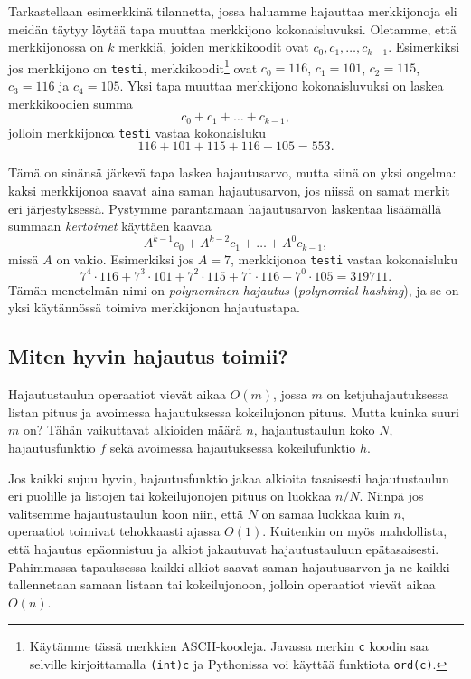 Tarkastellaan esimerkkinä tilannetta, jossa haluamme hajauttaa merkkijonoja
eli mei\-dän täytyy löytää tapa muuttaa merkkijono kokonaisluvuksi.
Oletamme, että merkkijonossa on $k$ merkkiä,
joiden merkkikoodit ovat $c_0,c_1,\dots,c_{k-1}$.
Esimerkiksi jos merkkijono on \texttt{testi},
merkkikoodit\footnote{Käytämme tässä merkkien ASCII-koodeja.
Javassa merkin \texttt{c} koodin saa
selville kirjoittamalla \texttt{(int)c}
ja Pythonissa voi käyttää funktiota \texttt{ord(c)}.} ovat $c_0=116$, $c_1=101$, $c_2=115$,
$c_3=116$ ja $c_4=105$.
Yksi tapa muuttaa merkkijono kokonaisluvuksi
on laskea merkkikoodien summa
\[ c_0 + c_1 + \dots + c_{k-1},\]
jolloin merkkijonoa \texttt{testi} vastaa kokonaisluku
\[116+101+115+116+105=553.\]


Tämä on sinänsä järkevä tapa laskea hajautusarvo, mutta siinä on yksi ongelma:
kaksi merkkijonoa saavat aina saman hajautusarvon,
jos niissä on samat merkit eri järjestyksessä.
Pystymme parantamaan hajautusarvon laskentaa lisäämällä
summaan \emph{kertoimet} käyttäen kaavaa
\[ A^{k-1} c_0 + A^{k-2} c_1 + \dots + A^0 c_{k-1},\]
missä $A$ on vakio.
Esimerkiksi jos $A=7$, merkkijonoa \texttt{testi} vastaa kokonaisluku
\[7^4 \cdot 116+7^3 \cdot 101+7^2 \cdot 115+7^1 \cdot 116+7^0 \cdot 105=319711.\]
Tämän menetelmän nimi on \emph{polynominen hajautus}
(\emph{polynomial hashing}),
ja se on yksi käytännössä toimiva merkkijonon hajautustapa.

\subsection{Miten hyvin hajautus toimii?}

Hajautustaulun operaatiot vievät aikaa $O(m)$,
jossa $m$ on ketjuhajautuksessa listan pituus
ja avoimessa hajautuksessa kokeilujonon pituus.
Mutta kuinka suuri $m$ on? Tähän vaikuttavat
alkioiden määrä $n$, hajautustaulun koko $N$,
hajautusfunktio $f$ sekä avoimessa hajautuksessa
kokeilufunktio $h$.

Jos kaikki sujuu hyvin, hajautusfunktio jakaa alkioita
tasaisesti hajautustaulun eri puolille
ja listojen tai kokeilujonojen pituus on luokkaa $n/N$.
Niinpä jos valitsemme hajautustaulun koon niin,
että $N$ on samaa luokkaa kuin $n$,
operaatiot toimivat tehokkaasti ajassa $O(1)$.
Kuitenkin on myös mahdollista, että hajautus epäonnistuu
ja alkiot jakautuvat hajautustauluun epätasaisesti.
Pahimmassa tapauksessa kaikki alkiot saavat saman
hajautusarvon ja ne kaikki tallennetaan samaan listaan
tai kokeilujonoon, jolloin operaatiot vievät aikaa $O(n)$.

